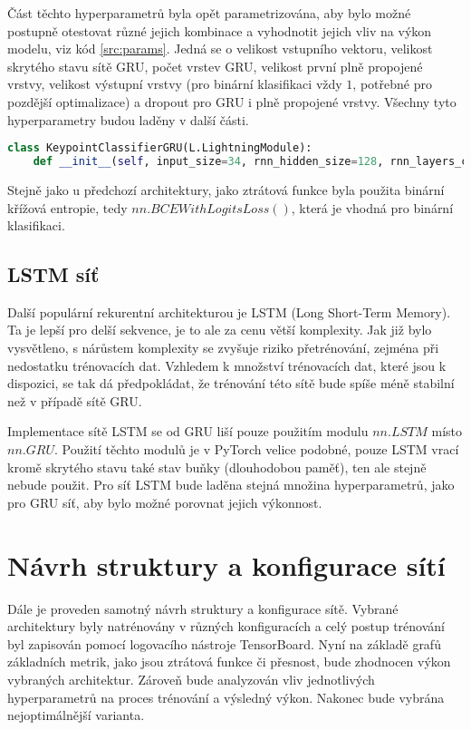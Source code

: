 Část těchto hyperparametrů byla opět parametrizována, aby bylo možné postupně
otestovat různé jejich kombinace a vyhodnotit jejich vliv na výkon modelu, viz
kód \ref{src:params}. Jedná se o velikost vstupního vektoru, velikost skrytého
stavu sítě GRU, počet vrstev GRU, velikost první plně propojené vrstvy,
velikost výstupní vrstvy (pro binární klasifikaci vždy $1$, potřebné pro
pozdější optimalizace) a dropout pro GRU i plně propojené vrstvy. Všechny tyto
hyperparametry budou laděny v další části.

\begin{lstlisting}[language=Python, label=src:params, caption={Parametry konstruktoru třídy $KeypointClassifierGRU$ definující hyperparametry sítě}]
class KeypointClassifierGRU(L.LightningModule):
    def __init__(self, input_size=34, rnn_hidden_size=128, rnn_layers_count=2, fc_size=128, output_size=1, rnn_dropout=0.3, fc_dropout=0.3, device=None):
\end{lstlisting}

Stejně jako u předchozí architektury, jako ztrátová funkce byla použita binární
křížová entropie, tedy $nn.BCEWithLogitsLoss()$, která je vhodná pro binární
klasifikaci.

\subsection{LSTM síť}

Další populární rekurentní architekturou je LSTM (Long Short-Term Memory). Ta
je lepší pro delší sekvence, je to ale za cenu větší komplexity. Jak již bylo
vysvětleno, s nárůstem komplexity se zvyšuje riziko přetrénování, zejména při
nedostatku trénovacích dat. Vzhledem k množství trénovacích dat, které jsou k
dispozici, se tak dá předpokládat, že trénování této sítě bude spíše méně
stabilní než v případě sítě GRU.

Implementace sítě LSTM se od GRU liší pouze použitím modulu $nn.LSTM$ místo
$nn.GRU$. Použití těchto modulů je v PyTorch velice podobné, pouze LSTM vrací
kromě skrytého stavu také stav buňky (dlouhodobou paměť), ten ale stejně nebude
použit. Pro síť LSTM bude laděna stejná množina hyperparametrů, jako pro GRU
síť, aby bylo možné porovnat jejich výkonnost.

\section{Návrh struktury a konfigurace sítí}

Dále je proveden samotný návrh struktury a konfigurace sítě. Vybrané
architektury byly natrénovány v různých konfiguracích a celý postup trénování
byl zapisován pomocí logovacího nástroje TensorBoard. Nyní na základě grafů
základních metrik, jako jsou ztrátová funkce či přesnost, bude zhodnocen výkon
vybraných architektur. Zároveň bude analyzován vliv jednotlivých hyperparametrů
na proces trénování a výsledný výkon. Nakonec bude vybrána nejoptimálnější
varianta.

